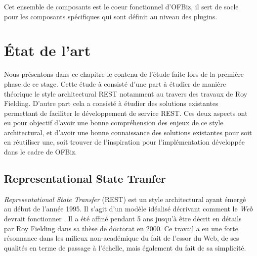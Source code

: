 \documentclass[a4paper, 11pt]{report}
\begin{document}
Cet ensemble de composants est le coeur fonctionnel d'OFBiz, il sert
de socle pour les composants spécifiques qui sont définit au
niveau des plugins.

\chapter{État de l'art}

Nous présentons dans ce chapitre le contenu de l'étude faite lors de
la première phase de ce stage. Cette étude à consisté d'une part à
étudier de manière théorique le style architectural REST notamment au
travers des travaux de Roy Fielding. D'autre part cela a consisté à
étudier des solutions existantes permettant de faciliter le
développement de service REST. Ces deux aspects ont eu pour objectif
d'avoir une bonne compréhension des enjeux de ce style architectural,
et d'avoir une bonne connaissance des solutions existantes pour soit
en réutiliser une, soit trouver de l'inspiration pour l'implémentation
développée dans le cadre de OFBiz.

\section{Representational State Tranfer}

\emph{Representational State Transfer} (REST) est un style
architectural ayant émergé au début de l'année 1995. Il s'agit d'un
modèle idéalisé décrivant comment le \emph{Web} devrait fonctionner
\cite{fielding2002principled}. Il a été affiné pendant 5 ans jusqu'à
être décrit en détails par Roy Fielding dans sa thèse de doctorat
\cite{fielding2000architectural} en 2000. Ce travail a eu une forte
résonnance dans les milieux non-académique du fait de l'essor du Web,
de ses qualités en terme de passage à l'échelle, mais également du
fait de sa simplicité.
\end{document}
